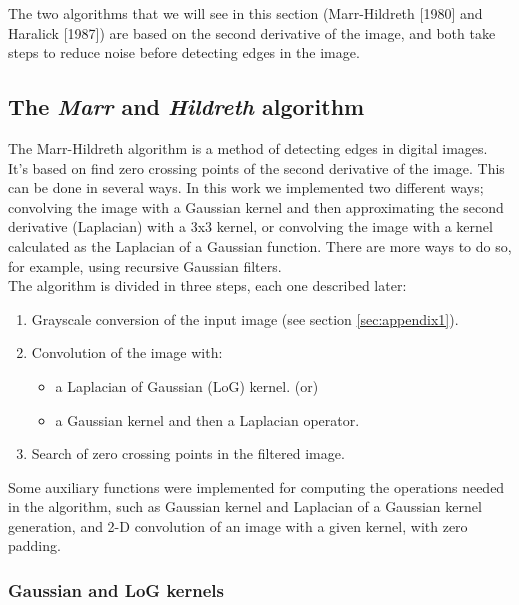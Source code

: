 \documentclass{ipol}
\numberwithin{equation}{section}
\numberwithin{table}{section}
\numberwithin{figure}{section}
\begin{document}
The two algorithms that we will see in this section (Marr-Hildreth [1980] and Haralick [1987]) 
are based on the second derivative of the image, and both take steps to reduce noise before 
detecting edges in the image.\\

\subsection{The \textit{Marr} and \textit{Hildreth} algorithm}

The Marr-Hildreth algorithm is a method of detecting edges in digital 
images. It's based on find zero crossing points of the second derivative
of the image. This can be done in several ways. In this work we implemented 
two different ways; convolving the image with a Gaussian kernel and then 
approximating the second derivative (Laplacian) with a 3x3 kernel, or 
convolving the image with a kernel calculated as the Laplacian of a 
Gaussian function. There are more ways to do so, for example, using 
recursive Gaussian filters.\\ %

The algorithm is divided in three steps, each one described later:
\begin{enumerate}
	\item Grayscale conversion of the input image (see section \ref{sec:appendix1}).
	\item Convolution of the image with:
	\begin{itemize}
		\item a Laplacian of Gaussian (LoG) kernel. (or)
		\item a Gaussian kernel and then a Laplacian operator.
	\end{itemize}
	\item Search of zero crossing points in the filtered image.\\
\end{enumerate}

Some auxiliary functions were implemented for computing the operations
needed in the algorithm, such as Gaussian kernel and Laplacian of a Gaussian 
kernel generation, and 2-D convolution of an image with a given kernel, 
with zero padding.\\



\subsubsection{Gaussian and LoG kernels}
\end{document}
